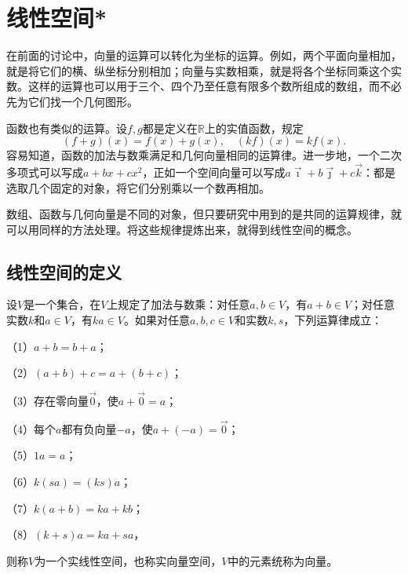 \section{线性空间*}
在前面的讨论中，向量的运算可以转化为坐标的运算。例如，两个平面向量相加，就是将它们的横、纵坐标分别相加；向量与实数相乘，就是将各个坐标同乘这个实数。这样的运算也可以用于三个、四个乃至任意有限多个数所组成的数组，而不必先为它们找一个几何图形。

函数也有类似的运算。设\(f , g\)都是定义在\(\mathbb{R}\)上的实值函数，规定
\begin{equation}
    \left( f + g \right) \left( x \right) = f \left( x \right) + g \left( x \right) , \quad \left( k f \right) \left( x \right) = k f \left( x \right) .
\end{equation}
容易知道，函数的加法与数乘满足和几何向量相同的运算律。进一步地，一个二次多项式可以写成\(a + b x + c x^{2}\)，正如一个空间向量可以写成\(a \vec{\imath} + b \vec{\jmath} + c \vec{k}\)：都是选取几个固定的对象，将它们分别乘以一个数再相加。

数组、函数与几何向量是不同的对象，但只要研究中用到的是共同的运算规律，就可以用同样的方法处理。将这些规律提炼出来，就得到线性空间的概念。

\subsection{线性空间的定义}
\begin{definition}\label{def:linspace}
设\(V\)是一个集合，在\(V\)上规定了加法与数乘：对任意\(a , b \in V\)，有\(a + b \in V\)；对任意实数\(k\)和\(a \in V\)，有\(k a \in V\)。如果对任意\(a , b , c \in V\)和实数\(k , s\)，下列运算律成立：

（1）\(a + b = b + a\)；

（2）\(\left( a + b \right) + c = a + \left( b + c \right)\)；

（3）存在零向量\(\vec{0}\)，使\(a + \vec{0} = a\)；

（4）每个\(a\)都有负向量\(- a\)，使\(a + \left( - a \right) = \vec{0}\)；

（5）\(1 a = a\)；

（6）\(k \left( s a \right) = \left( k s \right) a\)；

（7）\(k \left( a + b \right) = k a + k b\)；

（8）\(\left( k + s \right) a = k a + s a\)，

则称\(V\)为一个实线性空间，也称实向量空间，\(V\)中的元素统称为向量。
\end{definition}

